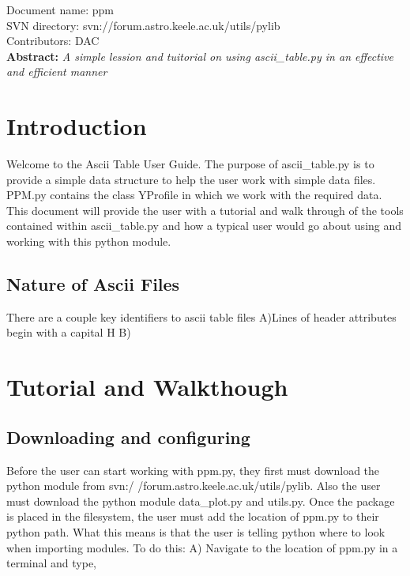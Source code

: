 \renewcommand{\ndoctitle}{ascii_table.py: Simple Ascii Table Data Structure} 
\renewcommand{\ndocname}{ppm}                      
\renewcommand{\svndir}{svn://forum.astro.keele.ac.uk/utils/pylib}  
\renewcommand{\ndoccontribs}{DAC}



Document name: \ndocname \\
SVN directory: \svndir\\
Contributors: \ndoccontribs\\



{  \textbf{Abstract:} \slshape
A simple lession and tuitorial on using ascii_table.py in an effective and efficient manner
}

\section{Introduction}
Welcome to the Ascii Table User Guide.  The purpose of ascii\_table.py is
to provide a simple data structure to help the user work with simple data files. 
PPM.py contains the class YProfile in which we work with the required data.
This document will provide the user with a 
tutorial and walk through of the tools contained within ascii\_table.py and
how a typical user would go about using and working with this python module.
\subsection{Nature of Ascii Files}
There are a couple key identifiers to ascii table files \newline
A)Lines of header attributes begin with a capital H \newline
B) 
\section{Tutorial and Walkthough}

\subsection{Downloading and configuring}
Before the user can start working with ppm.py, they first must download the python 
module from svn:/ /forum.astro.keele.ac.uk/utils/pylib.  Also the user must download the python module data\_plot.py and utils.py. Once the package is placed in the filesystem, the user must add the location
of ppm.py to their python path.  What this means is that the user is telling python where to look when importing modules.
To do this:
\newline
A) Navigate to the location of ppm.py in a terminal and type,

